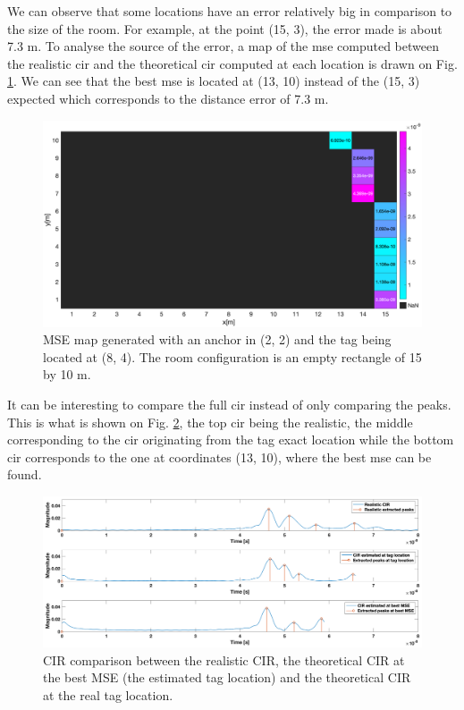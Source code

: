 We can observe that some locations have an error relatively big in comparison to the size of the room. For example, at the point (15, 3), the error made is about 7.3 m. To analyse the source of the error, a map of the \gls{mse} computed between the realistic \gls{cir} and the theoretical \gls{cir} computed at each location is drawn on Fig. \ref{fig:mse_analysis}. We can see that the best \gls{mse} is located at (13, 10) instead of the (15, 3) expected which corresponds to the distance error of 7.3 m.

\begin{figure}[H]
\centering
\includegraphics[width=\linewidth]{Images/no_name_1.png}
\caption{MSE map generated with an anchor in (2, 2) and the tag being located at (8, 4). The room configuration is an empty rectangle of 15 by 10 m. \label{fig:mse_analysis}}
\end{figure}

It can be interesting to compare the full \gls{cir} instead of only comparing the peaks. This is what is shown on Fig. \ref{fig:cir_compa}, the top \gls{cir} being the realistic, the middle corresponding to the \gls{cir} originating from the tag exact location while the bottom \gls{cir} corresponds to the one at coordinates (13, 10), where the best \gls{mse} can be found.

\begin{figure}[H]
\centering
\includegraphics[width=\linewidth]{Images/no_name_2.png}
\caption{CIR comparison between the realistic CIR, the theoretical CIR at the best MSE (the estimated tag location) and the theoretical CIR at the real tag location. \label{fig:cir_compa}}
\end{figure}

